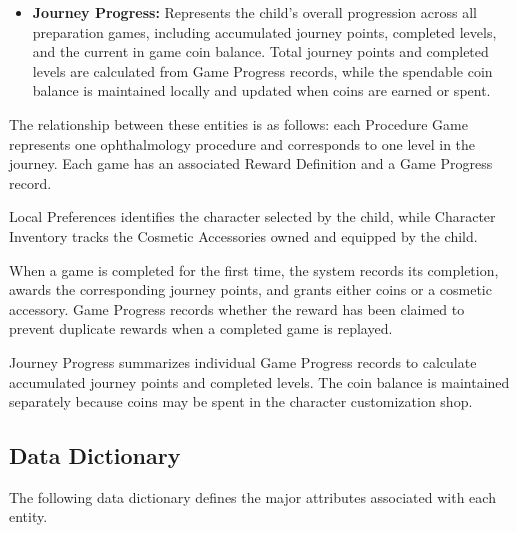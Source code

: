 \documentclass[12pt]{article}
\begin{document}
\begin{itemize}
    \item \textbf{Journey Progress:}
    Represents the child's overall progression across
    all preparation games, including accumulated journey
    points, completed levels, and the current in game
    coin balance. Total journey points and completed
    levels are calculated from Game Progress records,
    while the spendable coin balance is maintained
    locally and updated when coins are earned or spent.

\end{itemize}

The relationship between these entities is as follows:
each Procedure Game represents one ophthalmology procedure
and corresponds to one level in the journey. Each game has
an associated Reward Definition and a Game Progress record.

Local Preferences identifies the character selected by the
child, while Character Inventory tracks the Cosmetic
Accessories owned and equipped by the child.

When a game is completed for the first time, the system
records its completion, awards the corresponding journey
points, and grants either coins or a cosmetic accessory.
Game Progress records whether the reward has been claimed
to prevent duplicate rewards when a completed game is
replayed.

Journey Progress summarizes individual Game Progress
records to calculate accumulated journey points and
completed levels. The coin balance is maintained
separately because coins may be spent in the
character customization shop.


\subsection{Data Dictionary}

The following data dictionary defines the major
attributes associated with each entity.
\end{document}

